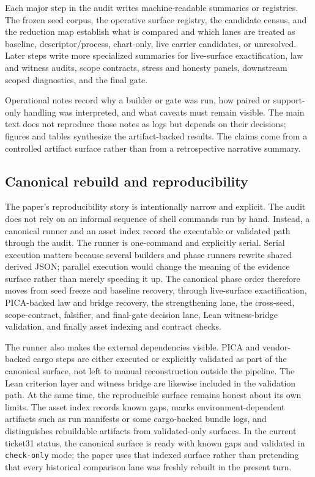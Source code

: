 \documentclass[11pt]{article}
\theoremstyle{definition}
\begin{document}
Each major step in the audit writes machine-readable summaries or registries. The
frozen seed corpus, the operative surface registry, the candidate census, and the
reduction map establish what is compared and which lanes are treated as baseline,
descriptor/process, chart-only, live carrier candidates, or unresolved. Later steps
write more specialized summaries for live-surface exactification, law and witness
audits, scope contracts, stress and honesty panels, downstream scoped diagnostics, and
the final gate.

Operational notes record why a builder or gate was run, how paired or support-only
handling was interpreted, and what caveats must remain visible. The main text does not
reproduce those notes as logs but depends on their decisions; figures and tables
synthesize the artifact-backed results. The claims come from a controlled artifact
surface rather than from a retrospective narrative summary.

\subsection{Canonical rebuild and reproducibility}

The paper's reproducibility story is intentionally narrow and explicit. The audit does
not rely on an informal sequence of shell commands run by hand. Instead, a canonical
runner and an asset index record the executable or validated path through the audit.
The runner is one-command and explicitly serial. Serial execution matters because
several builders and phase runners rewrite shared derived JSON; parallel execution would
change the meaning of the evidence surface rather than merely speeding it up. The
canonical phase order therefore moves from seed freeze and baseline recovery, through
live-surface exactification, PICA-backed law and bridge recovery, the strengthening lane,
the cross-seed, scope-contract, falsifier, and final-gate decision lane, Lean
witness-bridge validation, and finally asset indexing and contract checks.

The runner also makes the external dependencies visible. PICA and vendor-backed cargo
steps are either executed or explicitly validated as part of the canonical surface, not
left to manual reconstruction outside the pipeline. The Lean criterion layer and witness
bridge are likewise included in the validation path. At the same time, the reproducible
surface remains honest about its own limits. The asset index records known gaps, marks
environment-dependent artifacts such as run manifests or some cargo-backed bundle logs,
and distinguishes rebuildable artifacts from validated-only surfaces. In the current
ticket31 status, the canonical surface is ready with known gaps and validated in
\texttt{check-only} mode; the paper uses that indexed surface rather than pretending that
every historical comparison lane was freshly rebuilt in the present turn.
\end{document}
